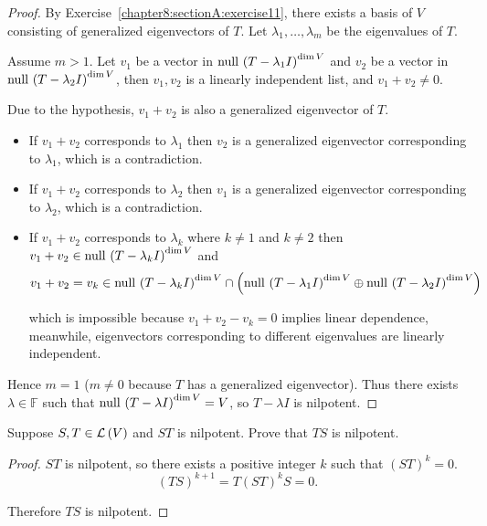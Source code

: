 \begin{proof}
    By Exercise~\ref{chapter8:sectionA:exercise11}, there exists a basis of $V$ consisting of generalized eigenvectors of $T$. Let $\lambda_{1}, \ldots, \lambda_{m}$ be the eigenvalues of $T$.

    Assume $m > 1$. Let $v_{1}$ be a vector in $\operatorname{null}\,{{(T - \lambda_{1}I)}^{\dim V}}$ and $v_{2}$ be a vector in $\operatorname{null}\,{{(T - \lambda_{2}I)}^{\dim V}}$, then $v_{1}, v_{2}$ is a linearly independent list, and $v_{1} + v_{2}\ne 0$.

    Due to the hypothesis, $v_{1} + v_{2}$ is also a generalized eigenvector of $T$.
    \begin{itemize}
        \item If $v_{1} + v_{2}$ corresponds to $\lambda_{1}$ then $v_{2}$ is a generalized eigenvector corresponding to $\lambda_{1}$, which is a contradiction.
        \item If $v_{1} + v_{2}$ corresponds to $\lambda_{2}$ then $v_{1}$ is a generalized eigenvector corresponding to $\lambda_{2}$, which is a contradiction.
        \item If $v_{1} + v_{2}$ corresponds to $\lambda_{k}$ where $k\ne 1$ and $k\ne 2$ then $v_{1} + v_{2}\in\operatorname{null}\,{{(T - \lambda_{k}I)}^{\dim V}}$ and
              \[
                  v_{1} + v_{2} = v_{k} \in \operatorname{null}\,{{(T - \lambda_{k}I)}^{\dim V}} \cap \left(\operatorname{null}\,{{(T - \lambda_{1}I)}^{\dim V}}\oplus\operatorname{null}\,{{(T - \lambda_{2}I)}^{\dim V}}\right)
              \]

              which is impossible because $v_{1} + v_{2} - v_{k} = 0$ implies linear dependence, meanwhile, eigenvectors corresponding to different eigenvalues are linearly independent.
    \end{itemize}

    Hence $m = 1$ ($m\ne 0$ because $T$ has a generalized eigenvector). Thus there exists $\lambda\in\mathbb{F}$ such that $\operatorname{null}\,{{(T - \lambda I)}^{\dim V}} = V$, so $T - \lambda I$ is nilpotent.
\end{proof}
\newpage

\begin{exercise}\label{chapter8:sectionA:exercise13}
    Suppose $S, T\in\mathcal{L}\left({V}\right)$ and $ST$ is nilpotent. Prove that $TS$ is nilpotent.
\end{exercise}

\begin{proof}
    $ST$ is nilpotent, so there exists a positive integer $k$ such that ${(ST)}^{k} = 0$.
    \[
        {(TS)}^{k+1} = T{(ST)}^{k}S = 0.
    \]

    Therefore $TS$ is nilpotent.
\end{proof}
\newpage

